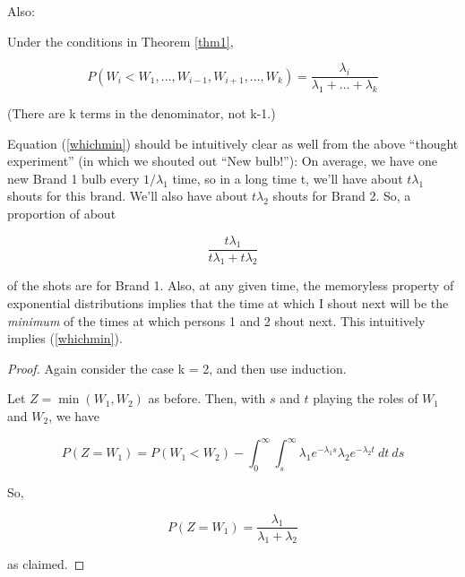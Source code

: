 Also:

\begin{theorem}
Under the conditions in Theorem \ref{thm1}, 

\begin{equation}
\label{whichmin}
P(W_i < W_1,...,W_{i-1}, W_{i+1},...,W_k) =
\frac{\lambda_i}{\lambda_1+...+\lambda_k}
\end{equation}

(There are k terms in the denominator, not k-1.)

\end{theorem}

Equation (\ref{whichmin}) should be intuitively clear as well from the
above ``thought experiment'' (in which we shouted out ``New bulb!''):
On average, we have one new Brand 1 bulb every $1/\lambda_1$ time, so in
a long time t, we'll have about $t \lambda_1$ shouts for this brand.
We'll also have about $t \lambda_2$ shouts for Brand 2.  So, a
proportion of about

\begin{equation}
\frac{t\lambda_1}{t\lambda_1 + t\lambda_2}
\end{equation}

of the shots are for Brand 1.  Also, at any given time, the memoryless
property of exponential distributions implies that the time at which I
shout next will be the {\it minimum} of the times at which persons 1 and
2 shout next.  This intuitively implies (\ref{whichmin}).

\begin{proof}

Again consider the case k = 2, and then use induction.

Let $Z = \min(W_1,W_2)$ as before.  Then, with $s$ and $t$ playing the
roles of $W_1$ and $W_2$, we have

\begin{equation}
P(Z = W_1) = P(W_1 < W_2) -
\int_{0}^{\infty} \int_{s}^{\infty} 
\lambda_1 e^{-\lambda_1 s}   
\lambda_2 e^{-\lambda_2 t}   
~ dt ~ ds
\end{equation}

So,

\begin{equation}
P(Z = W_1) = \frac{\lambda_1}{\lambda_1 + \lambda_2}
\end{equation}

as claimed.

\end{proof}


